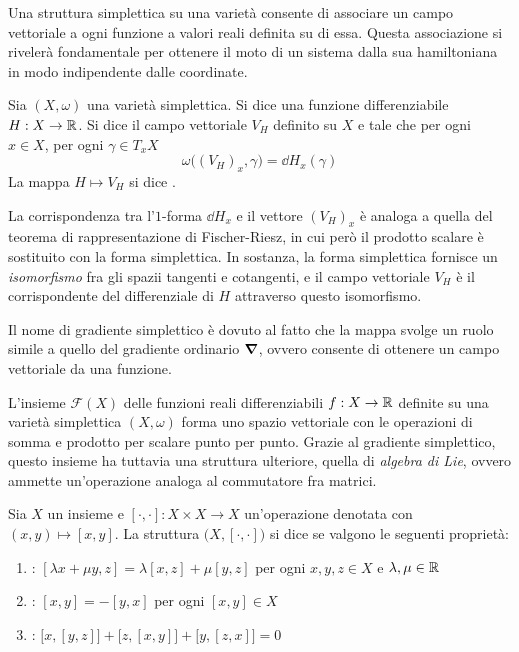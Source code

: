 Una struttura simplettica su una varietà consente di associare un campo vettoriale a ogni funzione a valori reali definita su di essa. Questa associazione si rivelerà fondamentale per ottenere il moto di un sistema dalla sua hamiltoniana in modo indipendente dalle coordinate.
\begin{definition} \label{def:hamField}
  Sia $(X, \omega)$ una varietà simplettica. Si dice  una funzione differenziabile $H: X \to \mathbb{R}$. Si dice  il campo vettoriale $V_H$ definito su $X$ e tale che per ogni $x \in X$, per ogni $\gamma \in T_x X$
  \begin{equation} \label{eq:hamField}
    \omega\big((V_H)_x, \gamma\big) = \dd{H}_x(\gamma)
  \end{equation}
  La mappa $H \mapsto V_H$ si dice .
\end{definition}
\begin{remark}
  La corrispondenza tra l'$1$-forma $\dd{H}_x$ e il vettore $(V_H)_x$ è analoga a quella del teorema di rappresentazione di Fischer-Riesz, in cui però il prodotto scalare è sostituito con la forma simplettica. In sostanza, la forma simplettica fornisce un \emph{isomorfismo} fra gli spazii tangenti e cotangenti, e il campo vettoriale $V_H$ è il corrispondente del differenziale di $H$ attraverso questo isomorfismo.
\end{remark}
\begin{remark}
  Il nome di gradiente simplettico è dovuto al fatto che la mappa svolge un ruolo simile a quello del gradiente ordinario $\grad$, ovvero consente di ottenere un campo vettoriale da una funzione.
\end{remark}

L'insieme $\mathcal{F}(X)$ delle funzioni reali differenziabili $f:X \to \mathbb{R}$ definite su una varietà simplettica $(X, \omega)$ forma uno spazio vettoriale con le operazioni di somma e prodotto per scalare punto per punto. Grazie al gradiente simplettico, questo insieme ha tuttavia una struttura ulteriore, quella di \emph{algebra di Lie}, ovvero ammette un'operazione analoga al commutatore fra matrici.
\begin{definition}
  Sia $X$ un insieme e $[\cdot , \cdot]:X \times X \to X$ un'operazione denotata con $(x,y) \mapsto [x,y]$. La struttura $\big(X, [\cdot ,\cdot ]\big)$ si dice  se valgono le seguenti proprietà: \begin{enumerate}
    \item {}: $[\lambda x + \mu y, z] = \lambda [x, z] + \mu[y,z]$ per ogni $x,y,z \in X$ e $\lambda, \mu \in  \mathbb{R}$
    \item {}: $[x,y] = -[y,x]$ per ogni $[x,y] \in X$
    \item {}: $\big[x,[y,z]\big] + \big[z,[x,y]\big] + \big[y,[z,x]\big] = 0$
  \end{enumerate}
\end{definition}

